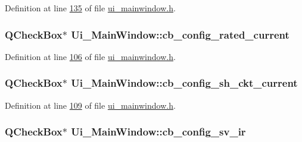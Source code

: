 Definition at line \hyperlink{a00139_source_l00135}{135} of file \hyperlink{a00139_source}{ui\+\_\+mainwindow.\+h}.

\hypertarget{a00080_af4863849ff58931ae3a38aa5b40b8158}{
\subsubsection[{cb\+\_\+config\+\_\+rated\+\_\+current}]{\setlength{\rightskip}{0pt plus 5cm}Q\+Check\+Box$\ast$ Ui\+\_\+\+Main\+Window\+::cb\+\_\+config\+\_\+rated\+\_\+current}}\label{a00080_af4863849ff58931ae3a38aa5b40b8158}


Definition at line \hyperlink{a00139_source_l00106}{106} of file \hyperlink{a00139_source}{ui\+\_\+mainwindow.\+h}.

\hypertarget{a00080_a541de6e510677e572ab233f7ecc25e2c}{
\subsubsection[{cb\+\_\+config\+\_\+sh\+\_\+ckt\+\_\+current}]{\setlength{\rightskip}{0pt plus 5cm}Q\+Check\+Box$\ast$ Ui\+\_\+\+Main\+Window\+::cb\+\_\+config\+\_\+sh\+\_\+ckt\+\_\+current}}\label{a00080_a541de6e510677e572ab233f7ecc25e2c}


Definition at line \hyperlink{a00139_source_l00109}{109} of file \hyperlink{a00139_source}{ui\+\_\+mainwindow.\+h}.

\hypertarget{a00080_a4db3ccfbbf8c5222dd2f042d3073bbe8}{
\subsubsection[{cb\+\_\+config\+\_\+sv\+\_\+ir}]{\setlength{\rightskip}{0pt plus 5cm}Q\+Check\+Box$\ast$ Ui\+\_\+\+Main\+Window\+::cb\+\_\+config\+\_\+sv\+\_\+ir}}\label{a00080_a4db3ccfbbf8c5222dd2f042d3073bbe8}


